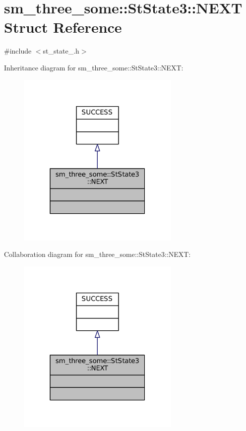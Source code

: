 \hypertarget{structsm__three__some_1_1StState3_1_1NEXT}{}\section{sm\+\_\+three\+\_\+some\+:\+:St\+State3\+:\+:N\+E\+XT Struct Reference}
\label{structsm__three__some_1_1StState3_1_1NEXT}


{\ttfamily \#include $<$st\+\_\+state\+\_.\+h$>$}



Inheritance diagram for sm\+\_\+three\+\_\+some\+:\+:St\+State3\+:\+:N\+E\+XT\+:
\nopagebreak
\begin{figure}[H]
\begin{center}
\leavevmode
\includegraphics[width=223pt]{structsm__three__some_1_1StState3_1_1NEXT__inherit__graph}
\end{center}
\end{figure}


Collaboration diagram for sm\+\_\+three\+\_\+some\+:\+:St\+State3\+:\+:N\+E\+XT\+:
\nopagebreak
\begin{figure}[H]
\begin{center}
\leavevmode
\includegraphics[width=223pt]{structsm__three__some_1_1StState3_1_1NEXT__coll__graph}
\end{center}
\end{figure}


